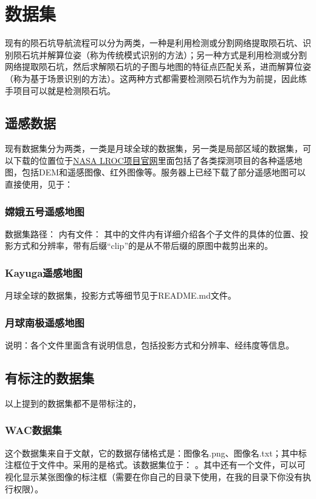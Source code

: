 \documentclass{article}
\begin{document}
\section{数据集}
现有的陨石坑导航流程可以分为两类，一种是利用检测或分割网络提取陨石坑、识别陨石坑并解算位姿（称为传统模式识别的方法）；另一种方式是利用检测或分割网络提取陨石坑，然后求解陨石坑的子图与地图的特征点匹配关系，进而解算位姿（称为基于场景识别的方法）。这两种方式都需要检测陨石坑作为为前提，因此练手项目可以就是检测陨石坑。
\subsection{遥感数据}
现有数据集分为两类，一类是月球全球的数据集，另一类是局部区域的数据集，可以下载的位置位于\href{https://astrogeology.usgs.gov/search?pmi-target=moon}{NASA LROC项目官网}里面包括了各类探测项目的各种遥感地图，包括DEM和遥感图像、红外图像等。服务器上已经下载了部分遥感地图可以直接使用，见于：
\subsubsection{嫦娥五号遥感地图}
数据集路径：
内有文件：
其中的文件内有详细介绍各个子文件的具体的位置、投影方式和分辨率，带有后缀“clip”的是从不带后缀的原图中裁剪出来的。
\subsubsection{Kayuga遥感地图}
月球全球的数据集，投影方式等细节见于README.md文件。
\subsubsection{月球南极遥感地图}
说明：各个文件里面含有说明信息，包括投影方式和分辨率、经纬度等信息。
\subsection{有标注的数据集}
以上提到的数据集都不是带标注的，
\subsubsection{WAC数据集}
这个数据集来自于文献\cite{yangCraterDANetConvolutionalNeural2022}，它的数据存储格式是：图像名.png、图像名.txt；其中标注框位于文件中。采用的是格式。该数据集位于：
。其中还有一个文件，可以可视化显示某张图像的标注框（需要在你自己的目录下使用，在我的目录下你没有执行权限）。
\end{document}

